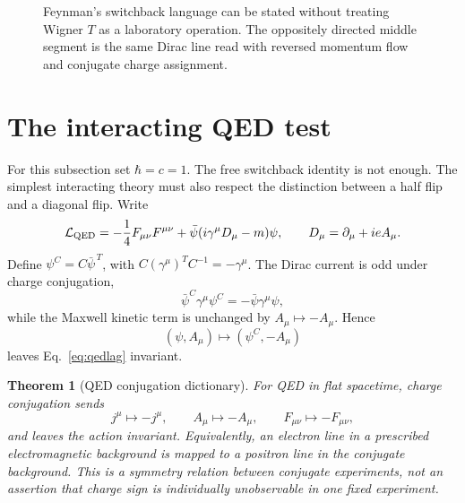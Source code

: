 \documentclass[11pt]{article}
\newtheorem{theorem}{Theorem}[section]
\theoremstyle{definition}\newtheorem{definition}[theorem]{Definition}
\theoremstyle{remark}\newtheorem{remark}[theorem]{Remark}\newtheorem{conjecture}[theorem]{Conjecture}
\begin{document}
\begin{figure}[t]
\centering
{}
\caption{Feynman's switchback language can be stated without treating Wigner $T$ as a laboratory operation. The oppositely directed middle segment is the same Dirac line read with reversed momentum flow and conjugate charge assignment.}
\label{fig:switchback}
\end{figure}

\section{The interacting QED test}
For this subsection set $\hbar=c=1$. The free switchback identity is not enough. The simplest interacting theory must also respect the distinction between a half flip and a diagonal flip. Write
\begin{equation}\label{eq:qedlag}
 \mathcal L_{\rm QED}=-\frac14F_{\mu\nu}F^{\mu\nu}
 +\bar\psi(i\gamma^\mu D_\mu-m)\psi,
 \qquad D_\mu=\partial_\mu+ieA_\mu.
\end{equation}
Define $\psi^C=C\bar\psi^{\,T}$, with $C(\gamma^\mu)^TC^{-1}=-\gamma^\mu$. The Dirac current is odd under charge conjugation,
\begin{equation}
 \bar\psi^C\gamma^\mu\psi^C=-\bar\psi\gamma^\mu\psi,
\end{equation}
while the Maxwell kinetic term is unchanged by $A_\mu\mapsto-A_\mu$. Hence
\begin{equation}
 (\psi,A_\mu)\mapsto(\psi^C,-A_\mu)
\end{equation}
leaves Eq.~\eqref{eq:qedlag} invariant.

\begin{theorem}[QED conjugation dictionary]\label{thm:qedC}
For QED in flat spacetime, charge conjugation sends
\begin{equation}
 j^\mu\mapsto-j^\mu,\qquad A_\mu\mapsto-A_\mu,\qquad F_{\mu\nu}\mapsto-F_{\mu\nu},
\end{equation}
and leaves the action invariant. Equivalently, an electron line in a prescribed electromagnetic background is mapped to a positron line in the conjugate background. This is a symmetry relation between conjugate experiments, not an assertion that charge sign is individually unobservable in one fixed experiment.
\end{theorem}
\end{document}
